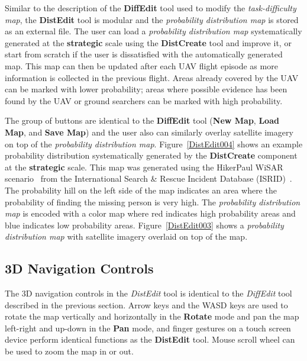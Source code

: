 Similar to the description of the \textbf{DiffEdit} tool used to modify the \textit{task-difficulty map}, the \textbf{DistEdit} tool is modular and the \textit{probability distribution map} is stored as an external file. The user can load a \textit{probability distribution map} systematically generated at the \textbf{strategic} scale using the \textbf{DistCreate} tool and improve it, or start from scratch if the user is dissatisfied with the automatically generated map. This map can then be updated after each UAV flight episode as more information is collected in the previous flight. Areas already covered by the UAV can be marked with lower probability; areas where possible evidence has been found by the UAV or ground searchers can be marked with high probability. 

The group of buttons are identical to the \textbf{DiffEdit} tool (\textbf{New Map}, \textbf{Load Map}, and \textbf{Save Map}) and the user also can similarly overlay satellite imagery on top of the \textit{probability distribution map}. Figure~\ref{DistEdit004} shows an example probability distribution systematically generated by the \textbf{DistCreate} component at the \textbf{strategic} scale. This map was generated using the HikerPaul WiSAR scenario~\cite{Lin2014Hierarchical} from the International Search \& Rescue Incident Database (ISRID)~\cite{Koester2008Lost}. The probability hill on the left side of the map indicates an area where the probability of finding the missing person is very high. The \textit{probability distribution map} is encoded with a color map where red indicates high probability areas and blue indicates low probability areas. Figure~\ref{DistEdit003} shows a \textit{probability distribution map} with satellite imagery overlaid on top of the map.

\subsection{3D Navigation Controls}

The 3D navigation controls in the \textit{DistEdit} tool is identical to the \textit{DiffEdit} tool described in the previous section. Arrow keys and the WASD keys are used to rotate the map vertically and horizontally in the \textbf{Rotate} mode and pan the map left-right and up-down in the \textbf{Pan} mode, and finger gestures on a touch screen device perform identical functions as the \textbf{DistEdit} tool. Mouse scroll wheel can be used to zoom the map in or out.

